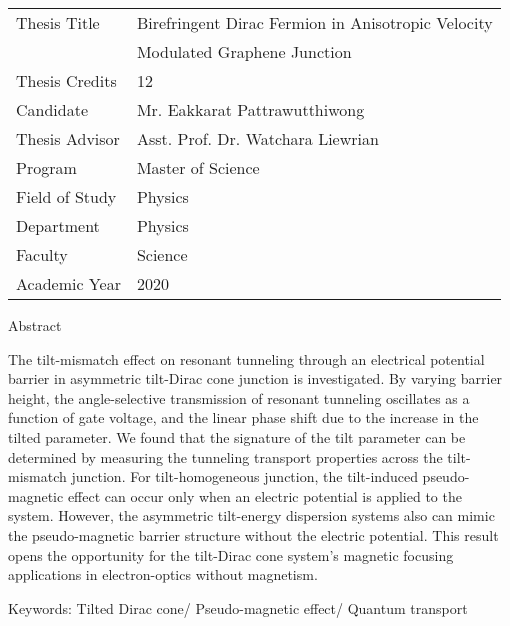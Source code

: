 \noindent 
{\begin{tabular}{ll} 
  Thesis Title &  Birefringent Dirac Fermion in Anisotropic Velocity  \\
               &  Modulated Graphene Junction \\
  Thesis Credits & 12 \\
  Candidate & Mr. Eakkarat Pattrawutthiwong \\
  Thesis Advisor & Asst. Prof. Dr. Watchara Liewrian \\
  Program & Master of Science  \\
  Field of Study & Physics \\
  Department & Physics \\
  Faculty & Science \\
  Academic Year & 2020 \\
\end{tabular}}

\vspace{1cm}

\centerline{Abstract}

\vspace{1cm}

The tilt-mismatch effect on resonant tunneling through an electrical potential barrier in asymmetric tilt-Dirac cone junction is investigated.
By varying barrier height, the angle-selective transmission of resonant tunneling oscillates as a function of gate voltage, and the linear phase shift due to the increase in the tilted parameter.
We found that the signature of the tilt parameter can be determined by measuring the tunneling transport properties across the tilt-mismatch junction.
For tilt-homogeneous junction, the tilt-induced pseudo-magnetic effect can occur only when an electric potential is applied to the system.
However, the asymmetric tilt-energy dispersion systems also can mimic the pseudo-magnetic barrier structure without the electric potential.
This result opens the opportunity for the tilt-Dirac cone system's magnetic focusing applications in electron-optics without magnetism.

\vspace{1cm}


{Keywords\;:}  Tilted Dirac cone/ Pseudo-magnetic effect/ Quantum transport


  
